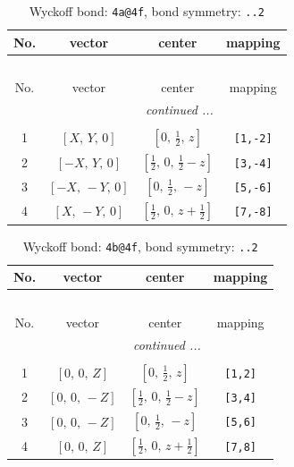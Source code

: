 \documentclass[fleqn,8pt]{jsarticle}
\begin{document}
\begin{longtable}{cccc}
\caption{Wyckoff bond: {\tt 4a@4f}, bond symmetry: {\tt ..2}}
 \\
 \hline \hline
No. & vector & center & mapping \\ \hline \endfirsthead

\multicolumn{3}{l}{\tablename\ \thetable{}} \\
 \hline \hline
No. & vector & center & mapping \\ \hline \endhead

 \hline \hline
\multicolumn{3}{r}{\footnotesize\it continued ...} \\ \endfoot

 \hline \hline
\multicolumn{3}{r}{} \\ \endlastfoot

1 & $\left[ X,\, Y,\, 0 \right]$ & $\left[ 0,\, \frac{1}{2},\, z \right]$ & {\tt [1,-2]} \\ \hline
2 & $\left[ - X,\, Y,\, 0 \right]$ & $\left[ \frac{1}{2},\, 0,\, \frac{1}{2} - z \right]$ & {\tt [3,-4]} \\ \hline
3 & $\left[ - X,\, - Y,\, 0 \right]$ & $\left[ 0,\, \frac{1}{2},\, - z \right]$ & {\tt [5,-6]} \\ \hline
4 & $\left[ X,\, - Y,\, 0 \right]$ & $\left[ \frac{1}{2},\, 0,\, z + \frac{1}{2} \right]$ & {\tt [7,-8]} \\
\end{longtable}
\renewcommand{\arraystretch}{1.2}
\begin{longtable}{cccc}
\caption{Wyckoff bond: {\tt 4b@4f}, bond symmetry: {\tt ..2}}
 \\
 \hline \hline
No. & vector & center & mapping \\ \hline \endfirsthead

\multicolumn{3}{l}{\tablename\ \thetable{}} \\
 \hline \hline
No. & vector & center & mapping \\ \hline \endhead

 \hline \hline
\multicolumn{3}{r}{\footnotesize\it continued ...} \\ \endfoot

 \hline \hline
\multicolumn{3}{r}{} \\ \endlastfoot

1 & $\left[ 0,\, 0,\, Z \right]$ & $\left[ 0,\, \frac{1}{2},\, z \right]$ & {\tt [1,2]} \\ \hline
2 & $\left[ 0,\, 0,\, - Z \right]$ & $\left[ \frac{1}{2},\, 0,\, \frac{1}{2} - z \right]$ & {\tt [3,4]} \\ \hline
3 & $\left[ 0,\, 0,\, - Z \right]$ & $\left[ 0,\, \frac{1}{2},\, - z \right]$ & {\tt [5,6]} \\ \hline
4 & $\left[ 0,\, 0,\, Z \right]$ & $\left[ \frac{1}{2},\, 0,\, z + \frac{1}{2} \right]$ & {\tt [7,8]} \\
\end{longtable}
\end{document}
